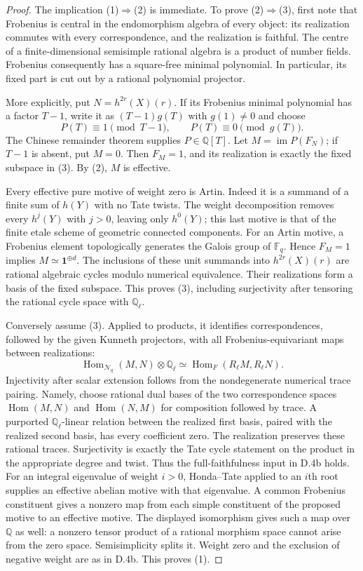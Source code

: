 \begin{proof}
The implication (1)$\Rightarrow$(2) is immediate. To prove
(2)$\Rightarrow$(3), first note that Frobenius is central in the
endomorphism algebra of every object: its realization commutes
with every correspondence, and the realization is faithful.
The centre of a finite-dimensional semisimple rational algebra
is a product of number fields. Frobenius consequently has a
square-free minimal polynomial. In particular, its fixed part
is cut out by a rational polynomial projector.

More explicitly, put $N=h^{2r}(X)(r)$. If its Frobenius minimal
polynomial has a factor $T-1$, write it as $(T-1)g(T)$ with
$g(1)\ne0$ and choose
\[
 P(T)\equiv1\pmod{T-1},\qquad P(T)\equiv0\pmod{g(T)}.
\]
The Chinese remainder theorem supplies $P\in\mathbb Q[T]$.
Let $M=\operatorname{im}P(F_N)$; if $T-1$ is absent, put $M=0$.
Then $F_M=1$, and its realization is exactly the fixed subspace
in (3). By (2), $M$ is effective.

Every effective pure motive of weight zero is Artin. Indeed
it is a summand of a finite sum of $h(Y)$ with no Tate
twists. The weight decomposition removes every $h^j(Y)$
with $j>0$, leaving only $h^0(Y)$; this last motive is that
of the finite etale scheme of geometric connected components.
For an Artin motive, a Frobenius element topologically
generates the Galois group of $\mathbb F_q$. Hence $F_M=1$
implies $M\simeq\mathbf1^{\oplus d}$.
The inclusions of these unit summands into $h^{2r}(X)(r)$
are rational algebraic cycles modulo numerical equivalence.
Their realizations form a basis of the fixed subspace.
This proves (3), including surjectivity after tensoring the
rational cycle space with $\mathbb Q_\ell$.

Conversely assume (3). Applied to products, it identifies
correspondences, followed by the given Kunneth projectors,
with all Frobenius-equivariant maps between realizations:
\[
 \operatorname{Hom}_{\mathcal N_q}(M,N)\otimes\mathbb Q_\ell
  \simeq
 \operatorname{Hom}_{F}(R_\ell M,R_\ell N).
\]
Injectivity after scalar extension follows from the
nondegenerate numerical trace pairing. Namely, choose
rational dual bases of the two correspondence spaces
$\operatorname{Hom}(M,N)$ and $\operatorname{Hom}(N,M)$
for composition followed by trace. A purported
$\mathbb Q_\ell$-linear relation between the realized
first basis, paired with the realized second basis,
has every coefficient zero. The realization preserves
these rational traces.
Surjectivity is exactly the Tate cycle statement on the
product in the appropriate degree and twist. Thus the
full-faithfulness input in D.4b holds. For an integral
eigenvalue of weight $i>0$, Honda--Tate applied to an
$i$th root supplies an effective abelian motive with that
eigenvalue. A common Frobenius constituent gives a nonzero
map from each simple constituent of the proposed motive
to an effective motive. The displayed isomorphism gives
such a map over $\mathbb Q$ as well: a nonzero tensor
product of a rational morphism space cannot arise from
the zero space. Semisimplicity splits it. Weight zero
and the exclusion of negative weight are as in D.4b.
This proves (1).
\end{proof}

